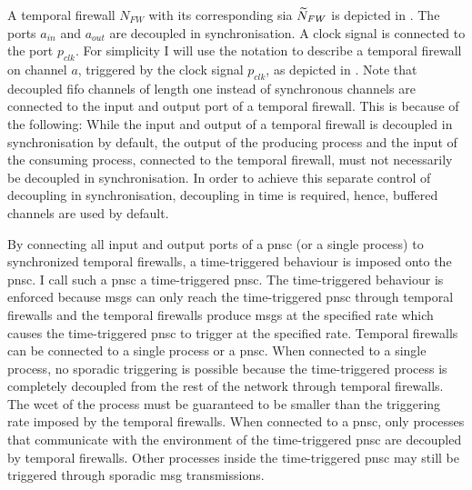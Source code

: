 A temporal firewall $N_{\mathit{FW}}$ with its corresponding \gls{sia} $\widetilde{N}_{\mathit{FW}}$ is depicted in \Fig{\ref{fig_tcm_tfw}}.
The ports $a_{in}$ and $a_{out}$ are decoupled in synchronisation.
A clock signal is connected to the port $p_{clk}$.
For simplicity I will use the notation  to describe a temporal firewall on channel $a$, triggered by the clock signal $p_{clk}$, as depicted in \Fig{\ref{fig_tcm_tfw}}.
Note that decoupled \gls{fifo} channels of length one instead of synchronous channels are connected to the input and output port of a temporal firewall.
This is because of the following:
While the input and output of a temporal firewall is decoupled in synchronisation by default, the output of the producing process and the input of the consuming process, connected to the temporal firewall, must not necessarily be decoupled in synchronisation.
In order to achieve this separate control of decoupling in synchronisation, decoupling in time is required, hence, buffered channels are used by default.

By connecting all input and output ports of a \gls{pnsc} (or a single process) to synchronized temporal firewalls, a time-triggered behaviour is imposed onto the \gls{pnsc}.
I call such a \gls{pnsc} a time-triggered \gls{pnsc}.
The time-triggered behaviour is enforced because \glspl*{msg} can only reach the time-triggered \gls{pnsc} through temporal firewalls and the temporal firewalls produce \glspl*{msg} at the specified rate which causes the time-triggered \gls{pnsc} to trigger at the specified rate.
Temporal firewalls can be connected to a single process or a \gls{pnsc}.
When connected to a single process, no sporadic triggering is possible because the time-triggered process is completely decoupled from the rest of the network through temporal firewalls.
The \gls{wcet} of the process must be guaranteed to be smaller than the triggering rate imposed by the temporal firewalls.
When connected to a \gls{pnsc}, only processes that communicate with the environment of the time-triggered \gls{pnsc} are decoupled by temporal firewalls.
Other processes inside the time-triggered \gls{pnsc} may still be triggered through sporadic \gls*{msg} transmissions.

